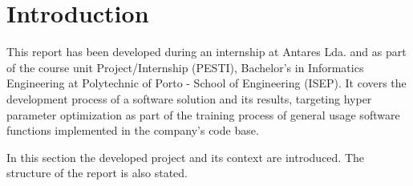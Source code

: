 
\section{Introduction}

This report has been developed during an internship at Antares Lda. and as part of the course unit Project/Internship (PESTI), Bachelor's in Informatics Engineering at Polytechnic of Porto - School of Engineering (ISEP). It covers the development process of a software solution and its results, targeting hyper parameter optimization as part of the training process of general usage software functions implemented in the company's code base.

In this section the developed project and its context are introduced. The structure of the report is also stated.





